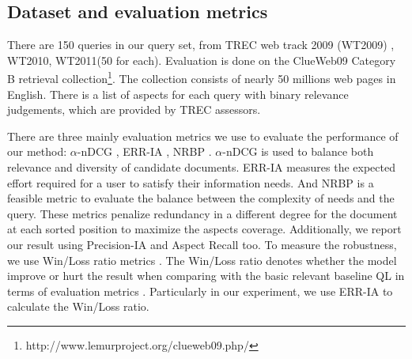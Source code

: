 \documentclass[review]{elsarticle}
\newcommand\revised[1]{{\color{black} #1}}
\begin{document}
\subsection{Dataset and evaluation metrics}
There are 150 queries in our query set, from TREC web track 2009 (WT2009) \cite{clarke2009preliminary}, WT2010, WT2011(50 for each). Evaluation is done on the ClueWeb09 Category B retrieval collection\footnote{http://www.lemurproject.org/clueweb09.php/}. The collection consists of nearly 50 millions web pages in English. There is a list of aspects for each query with binary relevance judgements, which are provided by TREC assessors.






\revised{
	There are three mainly evaluation metrics we use to evaluate the performance of our method: $\alpha$-nDCG \cite{clarke2008novelty}, ERR-IA \cite{chapelle2009expected}, NRBP \cite{clarke2009effectiveness}. 
	$\alpha$-nDCG is used to balance both relevance and diversity of candidate documents. ERR-IA measures the expected effort required for a user to satisfy their information needs. And NRBP is a feasible metric to evaluate the balance between the complexity of needs and the query.
	These metrics penalize redundancy in a different degree for the document at each sorted position to maximize the aspects coverage. Additionally, we report our result using Precision-IA  and Aspect Recall too. To measure the robustness, we use Win/Loss ratio metrics \cite{yue2008predicting,dang2012diversity}. The Win/Loss ratio denotes whether the model improve or hurt the result when comparing with the basic relevant baseline QL in terms of evaluation metrics \cite{dang2012diversity}. Particularly in our experiment, we use ERR-IA to calculate the Win/Loss ratio.
	}
\end{document}
